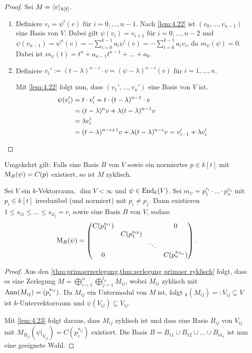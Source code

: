 \documentclass[12pt,a4paper]{scrartcl}
\theoremstyle{cplain}
\theoremstyle{cdef}
\begin{document}
\begin{proof}
	Sei $M = \langle v\rangle_{k[t]}$.
	\begin{enumerate}[label=\ref{lem:4.23:\roman*}]
		\item Definiere $v_i = \psi^i(v)$ für $i = 0,\dots, n-1$. Nach \cref{lem:4.22} ist $(v_0,\dots, v_{n-1})$ eine Basis von $V$. Dabei gilt $\psi(v_{i}) = v_{i+1}$ für $i = 0,\dots, n-2$ und $\psi(v_{n-1}) =\psi^n(v) = -\sum_{i = 0}^{k-1}a_i\psi^i(v) = -\sum_{i = 0}^{k-1}a_iv_i$, da $m_{\psi}(\psi) = 0$. Dabei ist $m_{\psi}(t) = t^n+a_{n-1}t^{n-1}+\dots + a_0$.
		\item Definiere $v_i' := (t-\lambda)^{n-i}\cdot v = (\psi-\lambda)^{n-i}(v)$ für $i = 1,\dots, n$.
		
		Mit \cref{lem:4.22} folgt nun, dass $(v_1',\dots, v_n')$ eine Basis von $V$ ist.
		\begin{align*}
			\psi(v_i') &= t\cdot v_i' = t\cdot(t-\lambda)^{n-1}\cdot v\\
			&= (t-\lambda)^nv + \lambda (t-\lambda)^{n-1}v\\
			&= \lambda v_i'\\
			&= (t-\lambda)^{n-i+1}v +\lambda(t-\lambda)^{n-i}v = v_{i-1}' + \lambda v_i'
			\qedhere
		\end{align*}
	\end{enumerate}
\end{proof}

\begin{bem}
	Umgekehrt gilt: Falls eine Basis $B$ von $V$ sowie ein normiertes $p\in k[t]$ mit $\operatorname{M}_B(\psi) =C(p)$ existiert, so ist $M$ zyklisch.
\end{bem}

\begin{satz} Sei $V$ ein $k$-Vektorraum, $\dim V <\infty$ und $\psi\in\operatorname{End}_k(V)$. Sei $m_{\psi} = p_1^{r_1}\cdot\ldots\cdot p_n^{r_n}$ mit $p_i\in k[t]$ irreduzibel (und normiert) mit $p_i\neq p_j$. Dann existieren $1\le s_{i1}\le\dots\le s_{i{l_j}}  = r_i$ sowie eine Basis $B$ von $V$, sodass
	\[ \operatorname{M}_B(\psi) = \begin{pmatrix}
	C(p_1^{s_{i1}}) &  &  & 0 \\ 
	& C(p_1^{s_{i2}}) &  &  \\ 
	&  & \ddots &  \\ 
	0 &  &  & C(p_n^{s_{i{l_n}}})
	\end{pmatrix}. \]
\end{satz}
\begin{proof}
	Aus den \cref{thm:primaerzerlegung,thm:zerlegung primaer zyklisch} folgt, dass es eine Zerlegung $M = \bigoplus_{i = 1}^n\bigoplus_{j = 1}^{l_n} M_{ij}$, wobei $M_{ij}$ zyklisch mit $\operatorname{Ann}(M_{ij})  = (p_i^{s_{ij}})$. Da $M_{ij}$ ein Untermodul von $M$ ist, folgt ${}_k(M_{ij}) =: V_{ij}\subseteq V$ ist $k$-Untervektorraum und $\psi(V_{ij})\subseteq V_{ij}$.
	
	Mit \cref{lem:4.23} folgt daraus, dass $M_{ij}$ zyklisch ist und dass eine Basis $B_{ij}$ von $V_{ij}$ mit $M_{B_{ij}}(\psi|_{V_{ij}}) = C(p_i^{s_{ij}})$ existiert. Die Basis $B = B_{11}\cup B_{12}\cup \dots \cup B_{nl_n}$ ist nun eine geeignete Wahl.
\end{proof}
\end{document}
